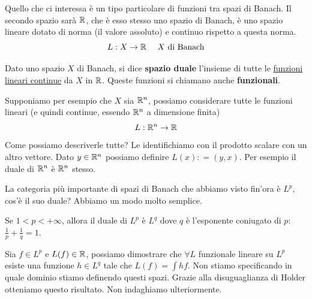 Quello che ci interessa è un tipo particolare di funzioni tra spazi di Banach. Il secondo spazio sarà $\mathbb{R}$, che è esso stesso uno spazio di Banach, è uno spazio lineare dotato di norma (il valore assoluto) e continuo rispetto a questa norma.
\begin{equation*}
L: X\rightarrow \mathbb{R} \ \ \ \ X\ \text{di Banach}
\end{equation*}
\begin{defn}
Dato uno spazio $X$ di Banach, si dice \textbf{spazio duale} l'insieme di tutte le \underline{funzioni lineari continue} da $X$ in $\mathbb{R}$. Queste funzioni si chiamano anche \textbf{funzionali}.
\end{defn}
Supponiamo per esempio che $X$ sia $\mathbb{R}^{n}$, possiamo considerare tutte le funzioni lineari (e quindi continue, essendo $\mathbb{R}^{n}$ a dimensione finita)
\begin{equation*}
L: \mathbb{R}^{n}\rightarrow \mathbb{R}
\end{equation*}
Come possiamo descriverle tutte? Le identifichiamo con il prodotto scalare con un altro vettore. Dato $y\in \mathbb{R}^{n}$ possiamo definire $L(x) : = (y, x)$. Per esempio il duale di $\mathbb{R}^{n}$ è $\mathbb{R}^{n}$ stesso.

La categoria più importante di spazi di Banach che abbiamo visto fin'ora è $L^{p}$, cos'è il suo duale? Abbiamo un modo molto semplice.
\begin{thm}
Se $1 < p < + \infty $, allora il duale di $L^{p}$ è $L^{q}$ dove $q$ è l'esponente coniugato di $p$: $\frac{1}{p} + \frac{1}{q} = 1$.
\end{thm}
Sia $f\in L^{p}$ e $L(f) \in \mathbb{R}$, possiamo dimostrare che $\forall L$ funzionale lineare su $L^{p}$ esiste una funzione $h\in L^{q}$ tale che $L(f) = \int hf$. Non stiamo specificando in quale dominio stiamo definendo questi spazi. Grazie alla disuguaglianza di Holder otteniamo questo risultato. Non indaghiamo ulteriormente.


